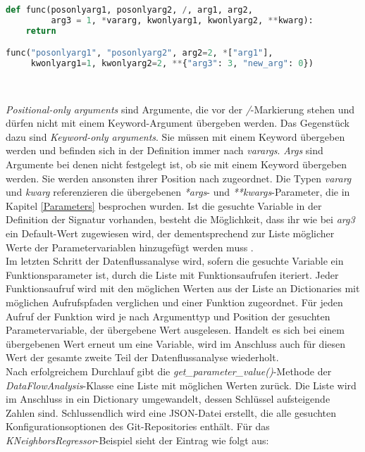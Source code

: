 \documentclass[german,bachelor]{swsLeipzig}
\begin{document}
\noindent\begin{minipage}{\linewidth}
\begin{lstlisting}[language=Python, frame=single, basicstyle=\small, label=args, caption={Parametertypen von Funktionen},captionpos=b]
def func(posonlyarg1, posonlyarg2, /, arg1, arg2,
         arg3 = 1, *vararg, kwonlyarg1, kwonlyarg2, **kwarg):
    return

func("posonlyarg1", "posonlyarg2", arg2=2, *["arg1"],
     kwonlyarg1=1, kwonlyarg2=2, **{"arg3": 3, "new_arg": 0})
\end{lstlisting}
\end{minipage}
\

\textit{Positional-only arguments} sind Argumente, die vor der \textit{/}-Markierung stehen und dürfen nicht mit einem
Keyword-Argument übergeben werden.
Das Gegenstück dazu sind \textit{Keyword-only arguments}.
Sie müssen mit einem Keyword übergeben werden und befinden sich in der Definition immer nach \textit{varargs}.
\textit{Args} sind Argumente bei denen nicht festgelegt ist, ob sie mit einem Keyword übergeben werden.
Sie werden ansonsten ihrer Position nach zugeordnet.
Die Typen \textit{vararg} und \textit{kwarg} referenzieren die übergebenen \textit{*args}- und \textit{**kwargs}-Parameter,
die in Kapitel \ref{Parameters} besprochen wurden.
Ist die gesuchte Variable in der Definition der Signatur vorhanden, besteht die Möglichkeit, dass ihr wie bei \textit{arg3} ein Default-Wert
zugewiesen wird, der dementsprechend zur Liste möglicher Werte der Parametervariablen hinzugefügt werden muss \cite[]{9425916}.\\

Im letzten Schritt der Datenflussanalyse wird, sofern die gesuchte Variable ein Funktionsparameter ist,
durch die Liste mit Funktionsaufrufen iteriert.
Jeder Funktionsaufruf wird mit den möglichen Werten aus der Liste an Dictionaries mit möglichen Aufrufspfaden verglichen und
einer Funktion zugeordnet.
Für jeden Aufruf der Funktion wird je nach Argumenttyp und Position der gesuchten Parametervariable, der übergebene
Wert ausgelesen.
Handelt es sich bei einem übergebenen Wert erneut um eine Variable, wird im Anschluss auch für diesen Wert
der gesamte zweite Teil der Datenflussanalyse wiederholt. \\

Nach erfolgreichem Durchlauf gibt die \textit{get\_parameter\_value()}-Methode der \textit{DataFlowAnalysis}-Klasse
eine Liste mit möglichen Werten zurück.
Die Liste wird im Anschluss in ein Dictionary umgewandelt, dessen Schlüssel aufsteigende Zahlen sind.
Schlussendlich wird eine JSON-Datei erstellt, die alle gesuchten Konfigurationsoptionen des Git-Repositories enthält.
Für das \textit{KNeighborsRegressor}-Beispiel sieht der Eintrag wie folgt aus: \\
\end{document}
